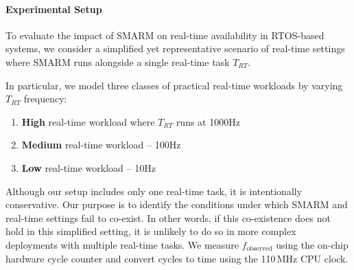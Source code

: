 \documentclass{ieeeaccess}
\begin{document}
\paragraph{\textbf{Experimental Setup}}
To evaluate the impact of SMARM on real-time availability in RTOS-based systems, we consider a simplified yet representative scenario of real-time settings where SMARM runs alongside a single real-time task $T_{RT}$.

In particular, we model three classes of practical real-time workloads by varying $T_{RT}$ frequency:
\begin{enumerate}
    \item \textbf{High} real-time workload where $T_{RT}$ runs at 1000Hz
    \item \textbf{Medium} real-time workload -- 100Hz
    \item \textbf{Low} real-time workload -- 10Hz
\end{enumerate}

Although our setup includes only one real-time task, it is intentionally conservative.
Our purpose is to identify the conditions under which SMARM and real-time settings fail to co-exist.
In other words, if this co-existence does not hold in this simplified setting, it is unlikely to do so in more complex deployments with multiple real-time tasks. We measure $f_{\text{observed}}$ using the on-chip hardware cycle counter and convert cycles to time using the 110\,MHz CPU clock.


\end{document}
